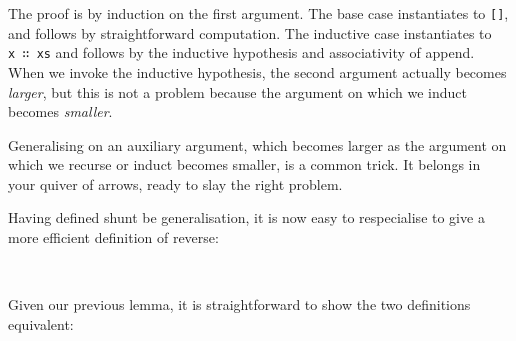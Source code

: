 The proof is by induction on the first argument. The base case
instantiates to \texttt{{[}{]}}, and follows by straightforward
computation. The inductive case instantiates to \texttt{x\ ∷\ xs} and
follows by the inductive hypothesis and associativity of append. When we
invoke the inductive hypothesis, the second argument actually becomes
\emph{larger}, but this is not a problem because the argument on which
we induct becomes \emph{smaller}.

Generalising on an auxiliary argument, which becomes larger as the
argument on which we recurse or induct becomes smaller, is a common
trick. It belongs in your quiver of arrows, ready to slay the right
problem.

Having defined shunt be generalisation, it is now easy to respecialise
to give a more efficient definition of reverse:

\begin{fence}
\begin{code}%
\>[0]\AgdaSpace{}%
\AgdaSymbol{:}\AgdaSpace{}%
\AgdaSpace{}%
\AgdaSymbol{\{}\AgdaSpace{}%
\AgdaSymbol{:}\AgdaSpace{}%
\AgdaSymbol{\}}\AgdaSpace{}%
\AgdaSpace{}%
\AgdaSpace{}%
\AgdaSpace{}%
\AgdaSpace{}%
\AgdaSpace{}%
\<%
\\
\>[0]\AgdaSpace{}%
\AgdaSpace{}%
\AgdaSymbol{=}\AgdaSpace{}%
\AgdaSpace{}%
\AgdaSpace{}%
\AgdaInductiveConstructor{[]}\<%
\end{code}
\end{fence}

Given our previous lemma, it is straightforward to show the two
definitions equivalent:

